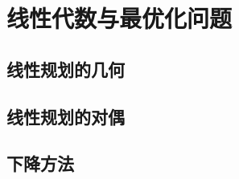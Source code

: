 \chapter{线性代数与最优化问题}

\section{线性规划的几何}


\section{线性规划的对偶}


\section{下降方法}


\begin{summary}

\end{summary}

\begin{exercise}

    \begin{exgroup}
        \item
    \end{exgroup}

    \begin{exgroup}
        \item
    \end{exgroup}

    \begin{exgroup}
        \item
    \end{exgroup}
\end{exercise}
